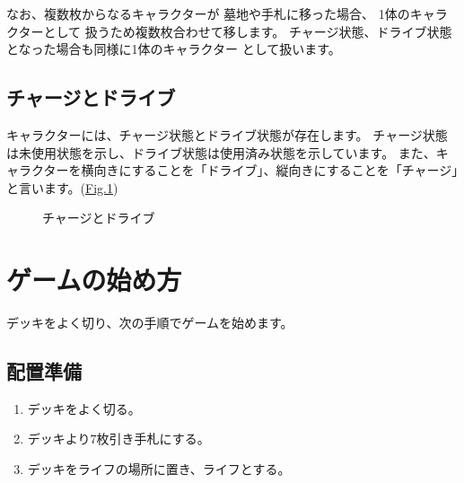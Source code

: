\documentclass[letterpaper,10pt,dvipdfmx]{sphinxmanual}
\begin{document}
\sphinxAtStartPar
なお、複数枚からなるキャラクターが
墓地や手札に移った場合、
1体のキャラクターとして
扱うため複数枚合わせて移します。
チャージ状態、ドライブ状態となった場合も同様に1体のキャラクター
として扱います。

\ignorespaces 

\subsection{チャージとドライブ}
\label{\detokenize{common/common:index-14}}\label{\detokenize{common/common:id15}}
\sphinxAtStartPar
キャラクターには、チャージ状態とドライブ状態が存在します。
チャージ状態は未使用状態を示し、ドライブ状態は使用済み状態を示しています。
また、キャラクターを横向きにすることを「ドライブ」、縦向きにすることを「チャージ」と言います。(\hyperref[\detokenize{common/common:chargedrive}]{Fig.\@ \ref{\detokenize{common/common:chargedrive}}})

\begin{figure}[htbp]
\centering
\capstart

\noindent{}
\caption{チャージとドライブ}\label{\detokenize{common/common:id45}}\label{\detokenize{common/common:chargedrive}}\end{figure}


\section{ゲームの始め方}
\label{\detokenize{common/common:common-gamestart}}\label{\detokenize{common/common:id16}}
\sphinxAtStartPar
デッキをよく切り、次の手順でゲームを始めます。


\subsection{配置準備}
\label{\detokenize{common/common:common-gamestart-field}}\label{\detokenize{common/common:id17}}\begin{enumerate}
%
\item {} 
\sphinxAtStartPar
デッキをよく切る。

\item {} 
\sphinxAtStartPar
デッキより7枚引き手札にする。

\item {} 
\sphinxAtStartPar
デッキをライフの場所に置き、ライフとする。

\end{enumerate}
\end{document}

